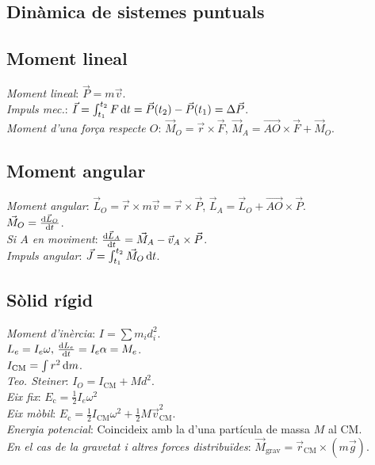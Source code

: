 \documentclass[10pt]{article}
\newcommand{\lp}{\left(}
\newcommand{\rp}{\right)}
\newcommand{\ci}{\textbullet\;}
\begin{document}
\begin{multicols}{3}
\section{Din\`amica de sistemes puntuals}

\subsection{Moment lineal}
\emph{Moment lineal}: $\vec{P} = m\vec{v}$. \\
\emph{Impuls mec.}: $\vec{I} = \int_{t_1}^{t_2} F \dif t = \vec{P}(t_2) - \vec{P}(t_1) = \Delta\vec{P}$. \\
\emph{Moment d'una força respecte $O$}: $\vec{M}_O = \vec{r}\times\vec{F}$, $\vec{M}_A = \vec{AO}\times\vec{F} + \vec{M}_O$.

\subsection{Moment angular}
\emph{Moment angular}: $\vec{L}_O = \vec{r}\times m\vec{v} = \vec{r}\times\vec{P}$, $\vec{L}_A = \vec{L}_O + \vec{AO}\times\vec{P}$. \\
\ci $\vec{M}_O = \frac{\dif \vec{L}_O}{\dif t}$. \\
\emph{Si $A$ en moviment}: $\frac{\dif \vec{L}_A}{\dif t} = \vec{M}_A - \vec{v}_A\times\vec{P}$.\\
\emph{Impuls angular}: $\vec{J} = \int_{t_1}^{t_2} \vec{M}_O\dif t$.

\subsection{Sòlid rígid}
\emph{Moment d'inèrcia}: $I = \sum m_i d_i^2$. \\
\ci $L_e = I_e\omega,\, \frac{\dif L_e}{\dif t} = I_e\alpha = M_e$. \\
\ci $I_{\text{CM}} = \int r^2 \dif m$. \\
\emph{Teo. Steiner}: $I_O = I_{\text{CM}} + Md^2$. \\
\emph{Eix fix}: $E_\text{c} = \frac{1}{2} I_e \omega^2 $\\
\emph{Eix mòbil}: $E_{\text{c}} = \frac{1}{2} I_\text{CM}\omega^2 + \frac{1}{2}  M\vec{v}_{\text{CM}}^2$.\\
\emph{Energia potencial}: Coincideix amb la d'una partícula de massa $M$ al CM.\\
\emph{En el cas de la gravetat i altres forces distribuïdes}: $\vec{M}_\text{grav}
  = \vec{r}_\text{CM} \times \lp m \vec{g} \rp$.

\end{multicols}
\end{document}
